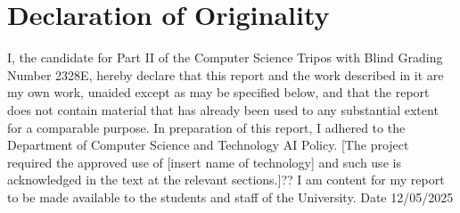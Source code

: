 \section*{Declaration of Originality}
I, the candidate for Part II of the Computer Science Tripos with Blind Grading Number 2328E, hereby declare that this report and the work described in it are my own work, unaided except as may be specified below, and that the report does not contain material that has already been used to any substantial extent for a comparable purpose. In preparation of this report, I adhered to the Department of Computer Science and Technology AI Policy. {\color{red}[The project required the approved use of [insert name of technology] and such use is acknowledged in the text at the relevant sections.]??} I am content for my report to be made available to the students and staff of the University. 
Date 12/05/2025